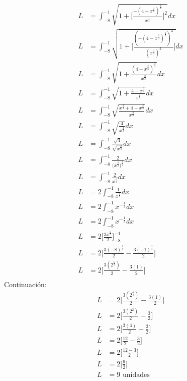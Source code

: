 \begin{align*}
    L &= \int_{-8}^{-1} \sqrt{1+ \Biggl[\frac{-(4 - x^{\frac{2}{3}})^{\frac{1}{2}}}{x^{\frac{1}{3}}}\Biggr]^{2}} dx \\
    L &= \int_{-8}^{-1} \sqrt{1+ \Biggl[\frac{(-(4 - x^{\frac{2}{3}})^{\frac{1}{2}})^{2}}{(x^{\frac{1}{3}})^{2}}\Biggr]} dx \\
    L &= \int_{-8}^{-1} \sqrt{1+ \frac{(4 - x^{\frac{2}{3}})^{\frac{2}{2}}}{x^{\frac{2}{3}}}} dx \\
    L &= \int_{-8}^{-1} \sqrt{1+ \frac{4 - x^{\frac{2}{3}}}{x^{\frac{2}{3}}}} dx \\
    L &= \int_{-8}^{-1} \sqrt{\frac{x^\frac{2}{3}+ 4 - x^{\frac{2}{3}}}{x^{\frac{2}{3}}}} dx \\
    L &= \int_{-8}^{-1} \sqrt{\frac{4}{x^{\frac{2}{3}}}} dx \\
    L &= \int_{-8}^{-1} \frac{\sqrt{4}}{\sqrt{x^{\frac{2}{3}}}} dx \\
    L &= \int_{-8}^{-1} \frac{2}{({x^{\frac{2}{3}})^{\frac{1}{2}}}} dx \\
    L &= \int_{-8}^{-1} \frac{2}{x^{\frac{1}{3}}} dx \\
    L &= 2 \int_{-8}^{-1} \frac{1}{x^{\frac{1}{3}}} dx \\
    L &= 2 \int_{-8}^{-1} x^{-\frac{1}{3}} dx \\
    L &= 2 \int_{-8}^{-1} x^{-\frac{1}{3}} dx \\
    L &= 2 \Biggl[ \frac{3x^{\frac{2}{3}}}{2} \Biggr]_{-8}^{-1} \\
    L &= 2 \Biggl[ \frac{3(-8)^{\frac{2}{3}}}{2} - \frac{3(-1)^{\frac{2}{3}}}{2} \Biggr] \\
    L &= 2 \Biggl[ \frac{3(2^{\frac{6}{3}})}{2} - \frac{3(1)}{2}  \Biggr] \\
\end{align*}
Continuación:
\begin{align*}
    L &= 2 \Biggl[ \frac{3(2^{\frac{6}{3}})}{2} - \frac{3(1)}{2}  \Biggr] \\
    L &= 2 \Biggl[ \frac{3(2^{2})}{2} - \frac{3}{2}  \Biggr] \\
    L &= 2 \Biggl[ \frac{3(4)}{2} - \frac{3}{2}  \Biggr] \\
    L &= 2 \Biggl[ \frac{12}{2} - \frac{3}{2}  \Biggr] \\
    L &= 2 \Biggl[ \frac{12 -3}{2}   \Biggr] \\
    L &= 2 \Biggl[ \frac{9}{2}   \Biggr] \\
    L &= 9 \text{ unidades}
\end{align*}